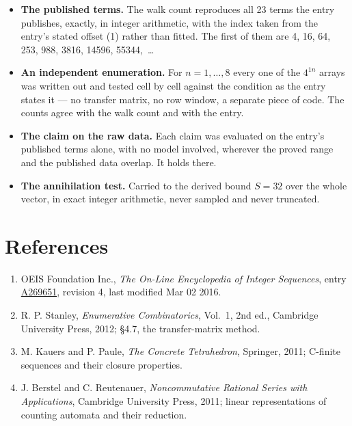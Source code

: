 \documentclass[11pt]{article}
\theoremstyle{definition}
\begin{document}
\begin{itemize}

\item {\bfseries The published terms.} The walk count reproduces all 23 terms the entry publishes, exactly, in integer arithmetic, with the index taken from the entry's stated offset (1) rather than fitted. The first of them are 4, 16, 64, 253, 988, 3816, 14596, 55344,~\dots

\item {\bfseries An independent enumeration.} For $n = 1,\dots,8$ every one of the $4^{1n}$ arrays was written out and tested cell by cell against the condition as the entry states it --- no transfer matrix, no row window, a separate piece of code. The counts agree with the walk count and with the entry.

\item {\bfseries The claim on the raw data.} Each claim was evaluated on the entry's published terms alone, with no model involved, wherever the proved range and the published data overlap. It holds there.

\item {\bfseries The annihilation test.} Carried to the derived bound $S = 32$ over the whole vector, in exact integer arithmetic, never sampled and never truncated.

\end{itemize}

\section{References}

\begin{enumerate}

\item OEIS Foundation Inc., \emph{The On-Line Encyclopedia of Integer Sequences}, entry \href{https://oeis.org/A269651}{A269651}, revision 4, last modified Mar 02 2016.

\item R. P. Stanley, \emph{Enumerative Combinatorics}, Vol.~1, 2nd ed., Cambridge University Press, 2012; \S4.7, the transfer-matrix method.

\item M. Kauers and P. Paule, \emph{The Concrete Tetrahedron}, Springer, 2011; C-finite sequences and their closure properties.

\item J. Berstel and C. Reutenauer, \emph{Noncommutative Rational Series with Applications}, Cambridge University Press, 2011; linear representations of counting automata and their reduction.

\end{enumerate}
\end{document}
